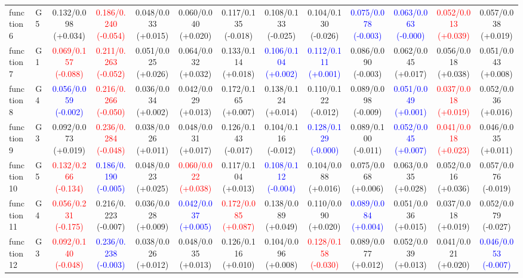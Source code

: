 \begin{table}[htbp]
\begin{adjustbox}{max width=\textwidth}
\begin{tabular}{llccccccccccc}
function6 & G5 & 0.132/0.098 (+0.034) & \textcolor{red}{0.186/0.240 (-0.054)} & 0.048/0.033 (+0.015) & 0.060/0.040 (+0.020) & 0.117/0.135 (-0.018) & 0.108/0.133 (-0.025) & 0.104/0.130 (-0.026) & \textcolor{blue}{0.075/0.078 (-0.003)} & \textcolor{blue}{0.063/0.063 (-0.000)} & \textcolor{red}{0.052/0.013 (+0.039)} & 0.057/0.038 (+0.019) \\
function7 & G1 & \textcolor{red}{0.069/0.157 (-0.088)} & \textcolor{red}{0.211/0.263 (-0.052)} & 0.051/0.025 (+0.026) & 0.064/0.032 (+0.032) & 0.133/0.114 (+0.018) & \textcolor{blue}{0.106/0.104 (+0.002)} & \textcolor{blue}{0.112/0.111 (+0.001)} & 0.086/0.090 (-0.003) & 0.062/0.045 (+0.017) & 0.056/0.018 (+0.038) & 0.051/0.043 (+0.008) \\
function8 & G4 & \textcolor{blue}{0.056/0.059 (-0.002)} & \textcolor{red}{0.216/0.266 (-0.050)} & 0.036/0.034 (+0.002) & 0.042/0.029 (+0.013) & 0.172/0.165 (+0.007) & 0.138/0.124 (+0.014) & 0.110/0.122 (-0.012) & 0.089/0.098 (-0.009) & \textcolor{blue}{0.051/0.049 (+0.001)} & \textcolor{red}{0.037/0.018 (+0.019)} & 0.052/0.036 (+0.016) \\
function9 & G3 & 0.092/0.073 (+0.019) & \textcolor{red}{0.236/0.284 (-0.048)} & 0.038/0.026 (+0.011) & 0.048/0.031 (+0.017) & 0.126/0.143 (-0.017) & 0.104/0.116 (-0.012) & \textcolor{blue}{0.128/0.129 (-0.000)} & 0.089/0.100 (-0.011) & \textcolor{blue}{0.052/0.045 (+0.007)} & \textcolor{red}{0.041/0.018 (+0.023)} & 0.046/0.035 (+0.011) \\
function10 & G5 & \textcolor{red}{0.132/0.266 (-0.134)} & \textcolor{blue}{0.186/0.190 (-0.005)} & 0.048/0.023 (+0.025) & \textcolor{red}{0.060/0.022 (+0.038)} & 0.117/0.104 (+0.013) & \textcolor{blue}{0.108/0.112 (-0.004)} & 0.104/0.088 (+0.016) & 0.075/0.068 (+0.006) & 0.063/0.035 (+0.028) & 0.052/0.016 (+0.036) & 0.057/0.076 (-0.019) \\
function11 & G4 & \textcolor{red}{0.056/0.231 (-0.175)} & 0.216/0.223 (-0.007) & 0.036/0.028 (+0.009) & \textcolor{blue}{0.042/0.037 (+0.005)} & \textcolor{red}{0.172/0.085 (+0.087)} & 0.138/0.089 (+0.049) & 0.110/0.090 (+0.020) & \textcolor{blue}{0.089/0.084 (+0.004)} & 0.051/0.036 (+0.015) & 0.037/0.018 (+0.019) & 0.052/0.079 (-0.027) \\
function12 & G3 & \textcolor{red}{0.092/0.140 (-0.048)} & \textcolor{blue}{0.236/0.238 (-0.003)} & 0.038/0.026 (+0.012) & 0.048/0.035 (+0.013) & 0.126/0.116 (+0.010) & 0.104/0.096 (+0.008) & \textcolor{red}{0.128/0.158 (-0.030)} & 0.089/0.077 (+0.012) & 0.052/0.039 (+0.013) & 0.041/0.021 (+0.020) & \textcolor{blue}{0.046/0.053 (-0.007)} \\

\end{tabular}
\end{adjustbox}
\end{table}
